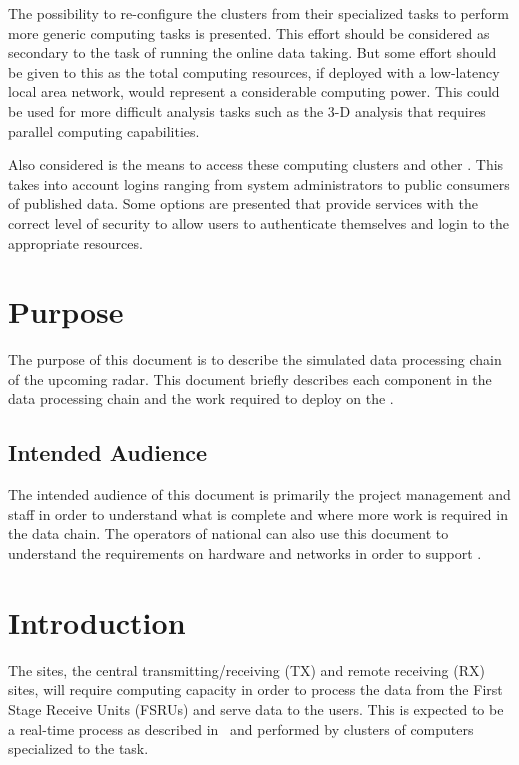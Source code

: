 \documentclass[12pt,a4paper]{article}
\begin{document}
The possibility to re-configure the clusters from their specialized tasks to perform more generic computing tasks is presented.
This effort should be considered as secondary to the task of running the online data taking.
But some effort should be given to this as the total computing resources, if deployed with a low-latency local area network, would represent a considerable computing power.
This could be used for more difficult analysis tasks such as the 3-D analysis that requires parallel computing capabilities.

Also considered is the means to access these computing clusters and other \ED \einfra.
This takes into account logins ranging from system administrators to public consumers of published data.
Some options are presented that provide services with the correct level of security to allow users to authenticate themselves and login to the appropriate resources.

\section{Purpose}
\label{purpose}

The purpose of this document is to describe the simulated data processing chain of the upcoming \ED radar.
This document briefly describes each component in the data processing chain and the work required to deploy on the .

\subsection{Intended Audience}

The intended audience of this document is primarily the \ED project management and staff in order to understand what is complete and where more work is required in the data chain.
The operators of national  can also use this document to understand the requirements on hardware and networks in order to support \ED.

\section{Introduction}
\label{intro}

The \ED sites, the central transmitting/receiving (TX) and remote receiving (RX) sites, will require computing capacity in order to process the data from the First Stage Receive Units (FSRUs) and serve data to the users.
This is expected to be a real-time process as described in~\cite{e3dds-del-2} and performed by clusters of computers specialized to the task.
\end{document}
